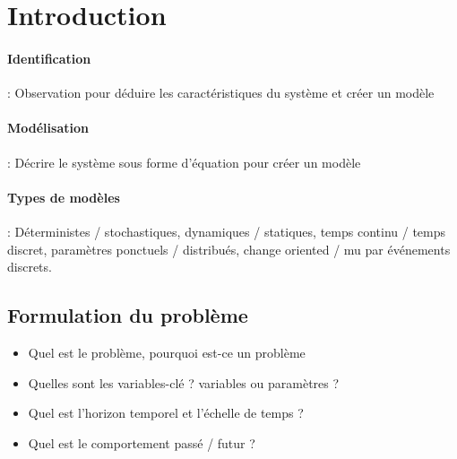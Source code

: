 \documentclass[resume]{subfiles}
\begin{document}
\section{Introduction}
\paragraph{Identification} : Observation pour déduire les caractéristiques du système et créer un modèle
\paragraph{Modélisation} : Décrire le système sous forme d'équation pour créer un modèle
\paragraph{Types de modèles} : Déterministes / stochastiques, dynamiques / statiques, temps continu / temps discret, paramètres ponctuels / distribués, change oriented / mu par événements discrets.
\subsection{Formulation du problème}
\begin{itemize}
\item Quel est le problème, pourquoi est-ce un problème
\item Quelles sont les variables-clé ? variables ou paramètres ?
\item Quel est l'horizon temporel et l'échelle de temps ?
\item Quel est le comportement passé / futur ?
\end{itemize}
\end{document}
